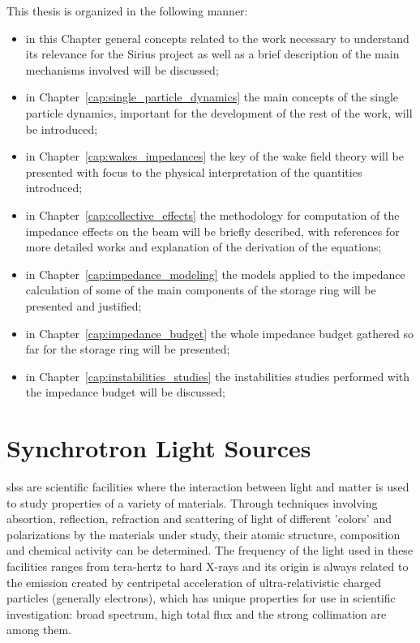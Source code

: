     This thesis is organized in the following manner:
    \begin{itemize}
        \item in this Chapter general concepts related to the work necessary to understand its relevance for the Sirius project as well as a brief description of the main mechanisms involved will be discussed;
        \item in Chapter~\ref{cap:single_particle_dynamics} the main concepts of the single particle dynamics, important for the development of the rest of the work, will be introduced;
        \item in Chapter~\ref{cap:wakes_impedances} the key of the wake field theory will be presented with focus to the physical interpretation of the quantities introduced;
        \item in Chapter~\ref{cap:collective_effects} the methodology for computation of the impedance effects on the beam will be briefly described, with references for more detailed works and explanation of the derivation of the equations;
        \item in Chapter~\ref{cap:impedance_modeling} the models applied to the impedance calculation of some of the main components of the storage ring will be presented and justified;
        \item in Chapter~\ref{cap:impedance_budget} the whole impedance budget gathered so far for the storage ring will be presented;
        \item in Chapter~\ref{cap:instabilities_studies} the instabilities studies performed with the impedance budget will be discussed;
    \end{itemize}

\section{Synchrotron Light Sources}

     \glspl{sls} are scientific facilities where the interaction between light and matter is used to study properties of a variety of materials. Through techniques involving absortion, reflection, refraction and scattering of light of different 'colors' and polarizations by the materials under study, their atomic structure, composition and chemical activity can be determined. The frequency of the light used in these facilities ranges from tera-hertz to hard X-rays and its origin is always related to the emission created by centripetal acceleration of ultra-relativistic charged particles (generally electrons), which has unique properties for use in scientific investigation: broad spectrum, high total flux and the strong collimation are among them.

